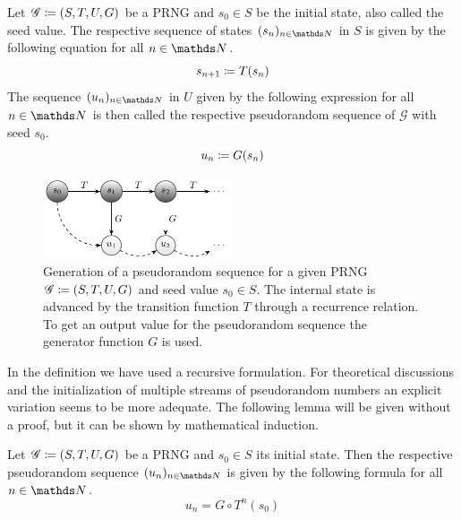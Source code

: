 \documentclass{stdlocal}
\begin{document}
  \begin{definition}
    Let $\mathscr{G}\coloneqq (S,T,U,G)$ be a PRNG and $s_0\in S$ be the initial state, also called the seed value.
    The respective sequence of states $(s_n)_{n\in\setNatural}$ in $S$ is given by the following equation for all $n\in\setNatural$.
    \[
      s_{n+1} \coloneqq T(s_n)
    \]
    The sequence $(u_n)_{n\in\setNatural}$ in $U$ given by the following expression for all $n\in\setNatural$ is then called the respective pseudorandom sequence of $\mathscr{G}$ with seed $s_0$.
    \[
      u_n \coloneqq G(s_n)
    \]
  \end{definition}
  \begin{figure}
    \center
    \includegraphics[width=0.5\textwidth]{figures/sequence_generation_scheme.pdf}
    \caption[Generation of a Pseudorandom Sequence]{%
      Generation of a pseudorandom sequence for a given PRNG $\mathscr{G}\coloneqq (S,T,U,G)$ and seed value $s_0\in S$.
      The internal state is advanced by the transition function $T$ through a recurrence relation.
      To get an output value for the pseudorandom sequence the generator function $G$ is used.
    }
    \label{fig:scheme-pseudorandom-sequence}
  \end{figure}
  In the definition we have used a recursive formulation.
  For theoretical discussions and the initialization of multiple streams of pseudorandom numbers an explicit variation seems to be more adequate.
  The following lemma will be given without a proof, but it can be shown by mathematical induction.

  \begin{lemma}
  \label{lemma:explicit-formulation-pseudorandom-sequence}
    Let $\mathscr{G}\coloneqq (S,T,U,G)$ be a PRNG and $s_0\in S$ its initial state.
    Then the respective pseudorandom sequence $(u_n)_{n\in\setNatural}$ is given by the following formula for all $n\in\setNatural$.
    \[
      u_n = G\circ T^{n}(s_0)
    \]
  \end{lemma}
\end{document}
